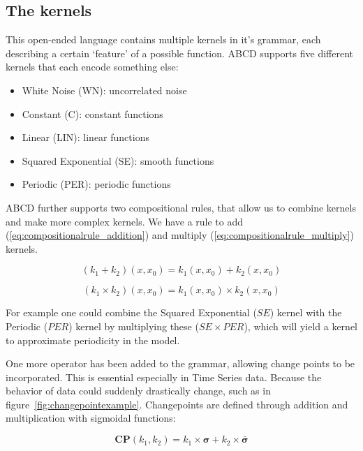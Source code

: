 \documentclass[a4paper, 10pt, conference]{ieeeconf}
\begin{document}
\subsection{The kernels}
This open-ended language contains multiple kernels in it's grammar, each describing a certain `feature' of a possible function. ABCD supports five different kernels that each encode something else:
\begin{itemize}
    \item White Noise (WN): uncorrelated noise
    \item Constant (C): constant functions
    \item Linear (LIN): linear functions
    \item Squared Exponential (SE): smooth functions
    \item Periodic (PER): periodic functions
\end{itemize}

ABCD further supports two compositional rules, that allow us to combine kernels and make more complex kernels. We have a rule to add (\ref{eq:compositionalrule_addition}) and multiply (\ref{eq:compositionalrule_multiply}) kernels.

\begin{equation}
    \label{eq:compositionalrule_addition}
    (k_1 + k_2)(x, x_0) = k_1(x, x_0) + k_2(x, x_0)
\end{equation}

\begin{equation}
    \label{eq:compositionalrule_multiply}
    (k_1 \times k_2)(x, x_0) = k_1(x, x_0) \times k_2(x, x_0)
\end{equation}

For example one could combine the Squared Exponential ($SE$) kernel with the Periodic ($PER$) kernel by multiplying these ($SE \times PER$), which will yield a kernel to approximate periodicity in the model.

One more operator has been added to the grammar, allowing change points to be incorporated. This is essential especially in Time Series data. Because the behavior of data could suddenly drastically change, such as in figure~\ref{fig:changepointexample}.
Changepoints are defined through addition and multiplication with sigmoidal functions:


\begin{equation}
    \label{eq:changepoint_1}
    \boldsymbol{CP}(k_1, k_2) = k_1 \times \boldsymbol{\sigma} + k_2 \times \boldsymbol{\bar{\sigma}}
\end{equation}
\end{document}
